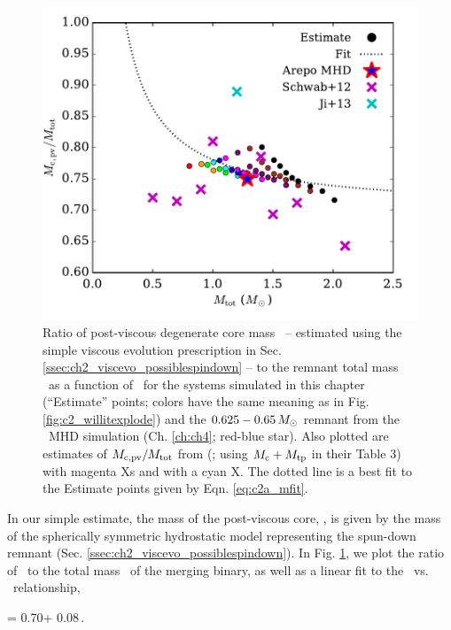 
\begin{figure}
\centering
\includegraphics[angle=0,width=0.6\columnwidth]{chapter2_zhu+13/figures/c2a_mcpv.pdf}
\caption{Ratio of post-viscous degenerate core mass \Mcpv\ -- estimated using the simple viscous evolution prescription in Sec. \ref{ssec:ch2_viscevo_possiblespindown} -- to the remnant total mass \Mtot\ as a function of \Mtot\ for the systems simulated in this chapter (``Estimate'' points; colors have the same meaning as in Fig. \ref{fig:c2_willitexplode}) and the $0.625 - 0.65\,\Msun$ remnant from the \arepo\ MHD simulation (Ch. \ref{ch:ch4}; red-blue star).  Also plotted are estimates of $\Mcpv/\Mtot$ from \citeauthor{schw+12} (\citeyear{schw+12}; using $M_\mathrm{c} + M_\mathrm{tp}$ in their Table 3) with magenta Xs and \cite{ji+13} with a cyan X.  The dotted line is a best fit to the Estimate points given by Eqn. \ref{eq:c2a_mfit}.}
\label{fig:c2a_mcpvvsmtot}
\end{figure}

In our simple estimate, the mass of the post-viscous core, \Mcpv, is given by the mass of the spherically symmetric hydrostatic model representing the spun-down remnant (Sec. \ref{ssec:ch2_viscevo_possiblespindown}).  In Fig. \ref{fig:c2a_mcpvvsmtot}, we plot the ratio of \Mcpv\ to the total mass \Mtot\ of the merging binary, as well as a linear fit to the \Mcpv\ vs. \Mtot\ relationship,

\eqbegin
\Mcpv = 0.70\Mtot + 0.08\,\Msun.
\label{eq:c2a_mfit}
\eqend

